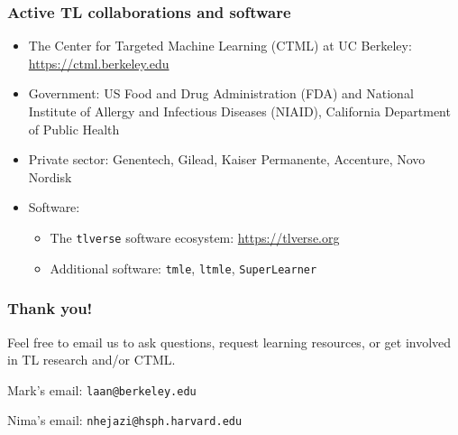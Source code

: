 \documentclass[t]{beamer}
\begin{document}
\begin{frame}
\frametitle{Active TL collaborations and software}
\begin{itemize}
\item The Center for Targeted Machine Learning (CTML) at UC Berkeley: \url{https://ctml.berkeley.edu}
\item Government: US Food and Drug Administration (FDA) and National Institute of Allergy and Infectious Diseases (NIAID), California Department of Public Health
\item Private sector: Genentech, Gilead, Kaiser Permanente, Accenture, Novo Nordisk
\item Software:
    \begin{itemize}
        \item The \texttt{tlverse} software ecosystem: \url{https://tlverse.org}
        \item Additional software: \texttt{tmle}, \texttt{ltmle}, \texttt{SuperLearner}
    \end{itemize}
    \end{itemize}
\end{frame}

\begin{frame}
\frametitle{Thank you!}
\vspace{10pt}
Feel free to email us to ask questions, request learning resources, or get
involved in TL research and/or CTML.

\vspace{10pt}
Mark's email: \texttt{laan@berkeley.edu}

\vspace{10pt}
Nima's email: \texttt{nhejazi@hsph.harvard.edu}



\end{frame}

\appendix

\begin{frame}
\centering
{}
  \appendixname
\end{frame}
\end{document}
